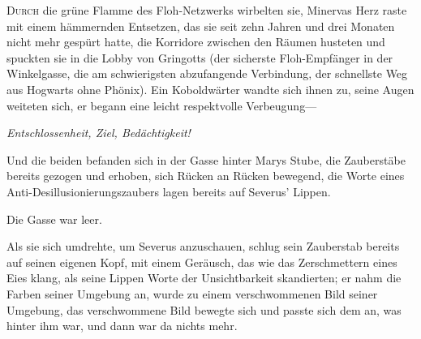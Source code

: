 
\lettrine{D}{urch} die grüne Flamme des Floh-Netzwerks wirbelten sie, Minervas Herz raste mit einem hämmernden Entsetzen, das sie seit zehn Jahren und drei Monaten nicht mehr gespürt hatte, die Korridore zwischen den Räumen husteten und spuckten sie in die Lobby von Gringotts (der sicherste Floh-Empfänger in der Winkelgasse, die am schwierigsten abzufangende Verbindung, der schnellste Weg aus Hogwarts ohne Phönix). Ein Koboldwärter wandte sich ihnen zu, seine Augen weiteten sich, er begann eine leicht respektvolle Verbeugung—

\emph{Entschlossenheit, Ziel, Bedächtigkeit!}

Und die beiden befanden sich in der Gasse hinter Marys Stube, die Zauberstäbe bereits gezogen und erhoben, sich Rücken an Rücken bewegend, die Worte eines Anti-Desillusionierungszaubers lagen bereits auf Severus' Lippen.

Die Gasse war leer.

Als sie sich umdrehte, um Severus anzuschauen, schlug sein Zauberstab bereits auf seinen eigenen Kopf, mit einem Geräusch, das wie das Zerschmettern eines Eies klang, als seine Lippen Worte der Unsichtbarkeit skandierten; er nahm die Farben seiner Umgebung an, wurde zu einem verschwommenen Bild seiner Umgebung, das verschwommene Bild bewegte sich und passte sich dem an, was hinter ihm war, und dann war da nichts mehr.

